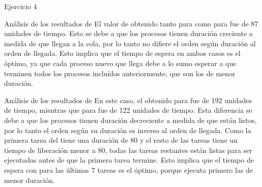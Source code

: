 \begin{section}{Ejercicio 4}
\begin{subsection}{Análisis de los resultados de }
	El valor de  obtenido tanto para  como para  fue de 87 unidades de tiempo. Esto se debe a que los procesos tienen duración creciente a medida de que llegan a la cola, por lo tanto no difiere el orden según duración al orden de llegada. Esto implica que el tiempo de espera en ambos casos es el óptimo, ya que cada proceso nuevo que llega debe a lo sumo esperar a que terminen todos los procesos incluídos anteriormente, que son los de menor duración.
\end{subsection}

\begin{subsection}{Análisis de los resultados de }
	En este caso, el  obtenido para  fue de 192 unidades de tiempo, mientras que para  fue de 122 unidades de tiempo. Esta diferencia se debe a que los procesos tienen duración decreciente a medida de que están listos, por lo tanto el orden según su duración es inverso al orden de llegada. Como la primera tarea del  tiene una duración de 80 y el resto de las tareas tiene un tiempo de liberación menor a 80, todas las tareas restantes están listas para ser ejecutadas antes de que la primera tarea termine. Esto implica que el tiempo de espera con  para las últimas 7 tareas es el óptimo, porque ejecuta primero las de menor duración.
\end{subsection}



\end{section}

